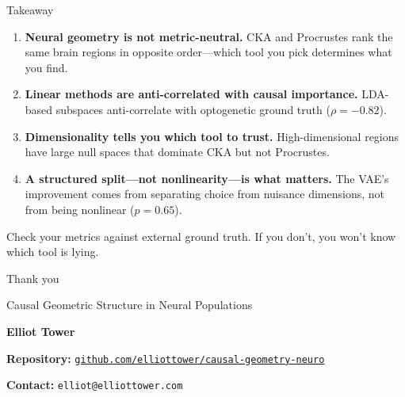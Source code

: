\documentclass[aspectratio=169,11pt]{beamer}
\begin{document}
\begin{frame}{Takeaway}
\begin{enumerate}\setlength\itemsep{0.6em}
  \item \textbf{Neural geometry is not metric-neutral.} CKA and Procrustes rank the same brain regions in opposite order---which tool you pick determines what you find.
  \item \textbf{Linear methods are anti-correlated with causal importance.} LDA-based subspaces anti-correlate with optogenetic ground truth ($\rho = -0.82$).
  \item \textbf{Dimensionality tells you which tool to trust.} High-dimensional regions have large null spaces that dominate CKA but not Procrustes.
  \item \textbf{A structured split---not nonlinearity---is what matters.} The VAE's improvement comes from separating choice from nuisance dimensions, not from being nonlinear ($p = 0.65$).
\end{enumerate}

\vspace{0.5em}
{\small Check your metrics against external ground truth. If you don't, you won't know which tool is lying.}
\end{frame}

\begin{frame}{Thank you}

\begin{center}
\vfill
{\Large Causal Geometric Structure in Neural Populations}

\vspace{1.5em}

\textbf{Elliot Tower}

\vspace{0.5em}

\textbf{Repository:} \href{https://github.com/elliottower/causal-geometry-neuro}{\texttt{github.com/elliottower/causal-geometry-neuro}}

\textbf{Contact:} \texttt{elliot@elliottower.com}

\vfill
\end{center}
\end{frame}
\end{document}
